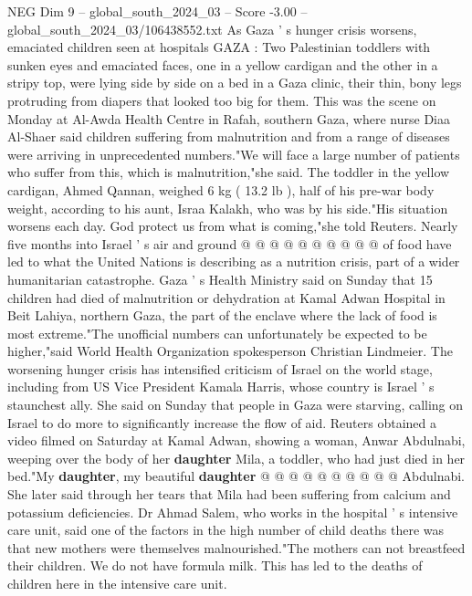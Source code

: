 \begin{textsample}{NEG Dim 9 – global\_south\_2024\_03 – Score -3.00 – global\_south\_2024\_03/106438552.txt}  \label{ex:f9_neg_375}
As Gaza ' s hunger crisis worsens, emaciated children seen at hospitals GAZA : Two Palestinian toddlers with sunken eyes and emaciated faces, one in a yellow cardigan and the other in a stripy top, were lying side by side on a bed in a Gaza clinic, their thin, bony legs protruding from diapers that looked too big for them.
This was the scene on Monday at Al-Awda Health Centre in Rafah, southern Gaza, where nurse Diaa Al-Shaer said children suffering from malnutrition and from a range of diseases were arriving in unprecedented numbers."We will face a large number of patients who suffer from this, which is malnutrition,"she said.
The toddler in the yellow cardigan, Ahmed Qannan, weighed 6 kg ( 13.2 lb ), half of his pre-war body weight, according to his aunt, Israa Kalakh, who was by his side."His situation worsens each day.
God protect us from what is coming,"she told Reuters.
Nearly five months into Israel ' s air and ground @ @ @ @ @ @ @ @ @ @ of food have led to what the United Nations is describing as a nutrition crisis, part of a wider humanitarian catastrophe.
Gaza ' s Health Ministry said on Sunday that 15 children had died of malnutrition or dehydration at Kamal Adwan Hospital in Beit Lahiya, northern Gaza, the part of the enclave where the lack of food is most extreme."The unofficial numbers can unfortunately be expected to be higher,"said World Health Organization spokesperson Christian Lindmeier.
The worsening hunger crisis has intensified criticism of Israel on the world stage, including from US Vice President Kamala Harris, whose country is Israel ' s staunchest ally.
She said on Sunday that people in Gaza were starving, calling on Israel to do more to significantly increase the flow of aid.
Reuters obtained a video filmed on Saturday at Kamal Adwan, showing a woman, Anwar Abdulnabi, weeping over the body of her \textbf{daughter} Mila, a toddler, who had just died in her bed."My \textbf{daughter}, my beautiful \textbf{daughter} @ @ @ @ @ @ @ @ @ @ Abdulnabi.
She later said through her tears that Mila had been suffering from calcium and potassium deficiencies.
Dr Ahmad Salem, who works in the hospital ' s intensive care unit, said one of the factors in the high number of child deaths there was that new mothers were themselves malnourished."The mothers can not breastfeed their children.
We do not have formula milk.
This has led to the deaths of children here in the intensive care unit.

\end{textsample}
